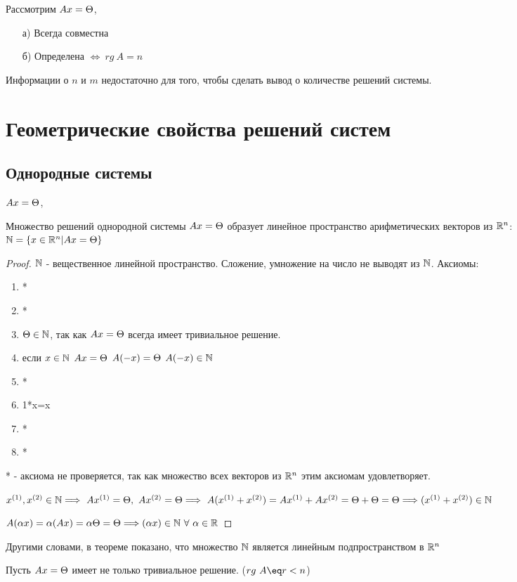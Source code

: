 Рассмотрим $Ax=\Theta$, 
\begin{itemize}
\item[а)] Всегда совместна
\item[б)] Определена $\Longleftrightarrow\ rg\ A=n$
\end{itemize}
Информации о $n$ и $m$ недостаточно для того, чтобы сделать вывод о количестве решений системы.
\chapter{Геометрические свойства решений систем}
\section{Однородные системы}
$Ax=\Theta$, 
\begin{theor}Множество решений однородной системы $Ax=\Theta$ образует линейное пространство арифметических векторов из $\mathbb{R}^n$: $\mathbb{N}=\left\{x\in\mathbb{R}^n|Ax=\Theta\right\}$
\end{theor}
\begin{proof}
$\mathbb{N}$ - вещественное линейной пространство. Сложение, умножение на число не выводят из $\mathbb{N}$.
Аксиомы:\begin{enumerate}
\item *
\item *
\item $\Theta\in\mathbb{N}$, так как $Ax=\Theta$ всегда имеет тривиальное решение.
\item если $x\in\mathbb{N}$ $Ax=\Theta$ \then $A(-x)=\Theta$ \then $A(-x)\in\mathbb{N}$
\item *
\item 1*x=x
\item *
\item *
\end{enumerate}
* - аксиома не проверяется, так как множество всех векторов из $\mathbb{R}^n$ этим аксиомам удовлетворяет.

$x^{(1)},x^{(2)}\in\N\Longrightarrow\ Ax^{(1)}=\T,\ Ax^{(2)}=\T\Longrightarrow\ A(x^{(1)}+x^{(2)})=Ax^{(1)}+Ax^{(2)}=\T+\T=\T\Longrightarrow (x^{(1)}+x^{(2)})\in\N$

$A(\alpha x)=\alpha(Ax)=\alpha\T=\T\Longrightarrow (\alpha x)\in\N\ \forall\ \alpha \in \R$
\end{proof}
\begin{remark}
Другими словами, в теореме показано, что множество $\mathbb{N}$ является линейным подпространством в $\mathbb{R}^n$
\end{remark}
Пусть $Ax=\Theta$ имеет не только тривиальное решение. ($rg\ A\eq r<n$)
